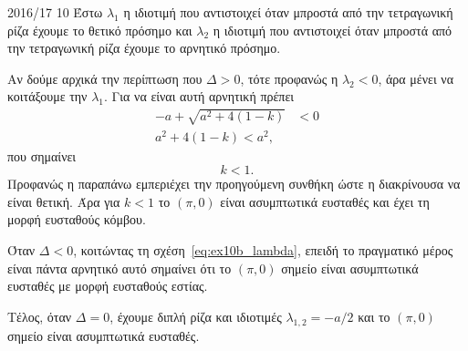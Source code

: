 \begin{solution}{2016/17 10}
    Έστω \( \lambda_1 \) η ιδιοτιμή που αντιστοιχεί όταν μπροστά από την
    τετραγωνική ρίζα έχουμε το θετικό πρόσημο και \( \lambda_2 \) η ιδιοτιμή
    που αντιστοιχεί όταν μπροστά από την τετραγωνική ρίζα έχουμε το αρνητικό
    πρόσημο.

    Αν δούμε αρχικά την περίπτωση που \( \Delta > 0 \), τότε προφανώς η \(
    \lambda_2 < 0 \), άρα μένει να κοιτάξουμε την \( \lambda_1 \). Για να είναι
    αυτή αρνητική πρέπει
    \begin{align*}
        -a + \sqrt{a^2 + 4(1 - k)} &< 0 \\
        a^2 + 4(1 - k) < a^2,
    \end{align*}
    που σημαίνει
    \[
        k < 1.
    \]
    Προφανώς η παραπάνω εμπεριέχει την προηγούμενη συνθήκη ώστε η διακρίνουσα να
    είναι θετική. Άρα για \( k < 1 \) το \( (\pi, 0) \) είναι ασυμπτωτικά
    ευσταθές και έχει τη μορφή ευσταθούς κόμβου.

    Όταν \( \Delta < 0 \), κοιτώντας τη σχέση~\eqref{eq:ex10b_lambda}, επειδή το
    πραγματικό μέρος είναι πάντα αρνητικό αυτό σημαίνει ότι το \( (\pi, 0) \) σημείο
    είναι ασυμπτωτικά ευσταθές με μορφή ευσταθούς εστίας.

    Τέλος, όταν \( \Delta = 0 \), έχουμε διπλή ρίζα και ιδιοτιμές \(
    \lambda_{1,2} = -a/2 \) και το \( (\pi, 0) \) σημείο είναι ασυμπτωτικά
    ευσταθές.


\end{solution}
